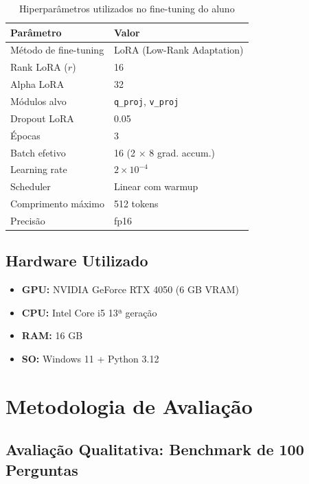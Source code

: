 \documentclass[12pt, a4paper]{article}
\begin{document}
\begin{table}[H]
\centering
\caption{Hiperparâmetros utilizados no fine-tuning do aluno}
\begin{tabular}{ll}
\toprule
\textbf{Parâmetro} & \textbf{Valor} \\
\midrule
Método de fine-tuning   & LoRA (Low-Rank Adaptation) \\
Rank LoRA ($r$)         & 16 \\
Alpha LoRA              & 32 \\
Módulos alvo            & \texttt{q\_proj}, \texttt{v\_proj} \\
Dropout LoRA            & 0.05 \\
Épocas                  & 3 \\
Batch efetivo           & 16 (2 $\times$ 8 grad. accum.) \\
Learning rate           & $2 \times 10^{-4}$ \\
Scheduler               & Linear com warmup \\
Comprimento máximo      & 512 tokens \\
Precisão                & fp16 \\
\bottomrule
\end{tabular}
\end{table}

\subsection{Hardware Utilizado}

\begin{itemize}
  \item \textbf{GPU:} NVIDIA GeForce RTX 4050 (6 GB VRAM)
  \item \textbf{CPU:} Intel Core i5 13ª geração
  \item \textbf{RAM:} 16 GB
  \item \textbf{SO:} Windows 11 + Python 3.12
\end{itemize}

\section{Metodologia de Avaliação}

\subsection{Avaliação Qualitativa: Benchmark de 100 Perguntas}
\end{document}

